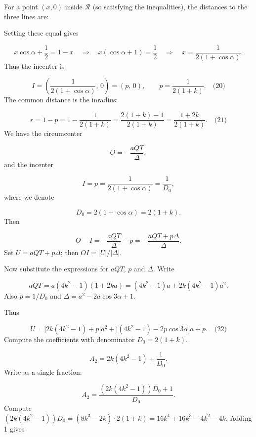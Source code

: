 For a point \((x,0)\) inside \(\mathcal{R}\) (so satisfying the inequalities), the distances to the three lines are:\par
{}
Setting these equal gives\par
\[
x\cos\alpha + \frac12 = 1 - x \quad\Longrightarrow\quad x(\cos\alpha + 1) = \frac12 \quad\Longrightarrow\quad x = \frac{1}{2(1+\cos\alpha)}.
\]
Thus the incenter is\par
\[
I = \left( \frac{1}{2(1+\cos\alpha)},\, 0 \right) = (p,\,0), \qquad p = \frac{1}{2(1+k)}. \quad\text{(20)}
\]
The common distance is the inradius:\par
\[
r = 1 - p = 1 - \frac{1}{2(1+k)} = \frac{2(1+k)-1}{2(1+k)} = \frac{1+2k}{2(1+k)}. \quad\text{(21)}
\]
\smallskip
{}
We have the circumcenter\par
\[
O = -\frac{a Q T}{\Delta},
\]
and the incenter\par
\[
I = p = \frac{1}{2(1+\cos\alpha)} = \frac{1}{D_0},
\]
where we denote\par
\[
D_0 = 2(1+\cos\alpha) = 2(1+k).
\]
Then\par
\[
O - I = -\frac{a Q T}{\Delta} - p = -\frac{a Q T + p \Delta}{\Delta}.
\]
Set \(U = a Q T + p \Delta\); then \(OI = |U|/|\Delta|\).\par
Now substitute the expressions for \(a Q T\), \(p\) and \(\Delta\). Write\par
\[
a Q T = a(4k^2-1)(1+2k a) = (4k^2-1)a + 2k(4k^2-1)a^2.
\]
Also \(p = 1/D_0\) and \(\Delta = a^2 - 2a\cos3\alpha + 1\).\par
Thus\par
\[
U = \bigl[2k(4k^2-1) + p\bigr] a^2 + \bigl[(4k^2-1) - 2p\cos3\alpha\bigr] a + p. \quad\text{(22)}
\]
Compute the coefficients with denominator \(D_0 = 2(1+k)\).\par
{}
\[
  A_2 = 2k(4k^2-1) + \frac{1}{D_0}.
  \]
Write as a single fraction:\par
\[
  A_2 = \frac{(2k(4k^2-1)) D_0 + 1}{D_0}.
  \]
Compute \((2k(4k^2-1)) D_0 = (8k^3-2k) \cdot 2(1+k) = 16k^4 + 16k^3 - 4k^2 - 4k.\) Adding 1 gives\par
